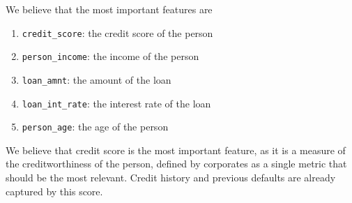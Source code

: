 \documentclass[11pt]{article}
\providecommand{\tightlist}{%
      \setlength{\itemsep}{0pt}\setlength{\parskip}{0pt}}
\begin{document}
We believe that the most important features are

\begin{enumerate}
\def\labelenumi{\arabic{enumi}.}
\tightlist
\item
  \texttt{credit\_score}: the credit score of the person\\
\item
  \texttt{person\_income}: the income of the person\\
\item
  \texttt{loan\_amnt}: the amount of the loan\\
\item
  \texttt{loan\_int\_rate}: the interest rate of the loan\\
\item
  \texttt{person\_age}: the age of the person
\end{enumerate}

We believe that credit score is the most important feature, as it is a
measure of the creditworthiness of the person, defined by corporates as
a single metric that should be the most relevant. Credit history and
previous defaults are already captured by this score.
\end{document}
